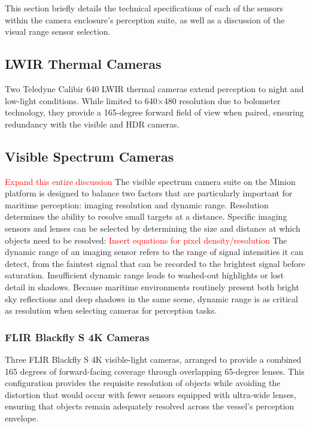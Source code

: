 \documentclass{erauthesis}
\begin{document}
This section briefly details the technical specifications of each of the sensors within the camera enclosure's perception suite, as well as a discussion of the visual range sensor selection.

\subsection{LWIR Thermal Cameras}
Two Teledyne Calibir 640 \ac{LWIR} thermal cameras extend perception to night and low-light conditions. 
While limited to 640×480 resolution due to bolometer technology, they provide a 165-degree forward field of view when paired, ensuring redundancy with the
visible and HDR cameras.

\subsection{Visible Spectrum Cameras}

\textcolor{red}{Expand this entire discussion}
The visible spectrum camera suite on the Minion platform is designed to balance two factors that are particularly important for maritime perception: imaging resolution and dynamic range.  
Resolution determines the ability to resolve small targets at a distance.
Specific imaging sensors and lenses can be selected by determining the size and distance at which objects need to be resolved:
\textcolor{red}{Insert equations for pixel density/resolution}
The dynamic range of an imaging sensor refers to the range of signal intensities it can detect, from the faintest signal that can be recorded to the brightest signal before saturation.
Insufficient dynamic range leads to washed-out highlights or lost detail in shadows.  
Because maritime environments routinely present both bright sky reflections and deep shadows in the same scene, dynamic range is as critical as resolution when selecting cameras for perception tasks.  

\subsubsection{FLIR Blackfly S 4K Cameras}

Three FLIR Blackfly S 4K visible-light cameras, arranged to provide a combined 165 degrees of forward-facing coverage through overlapping 65-degree lenses.  
This configuration provides the requisite resolution of objects while avoiding the distortion that would occur with fewer sensors equipped with ultra-wide lenses, ensuring that objects remain adequately resolved across the vessel's perception envelope.  
\end{document}
